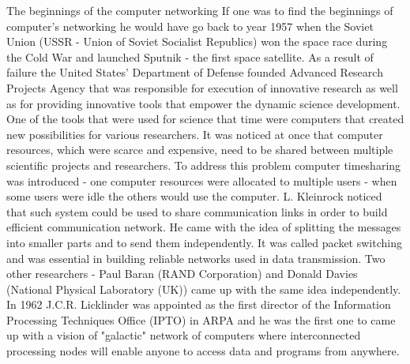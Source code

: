 \documentclass[magisterska,en]{pracamgr}
\begin{document}
\newpage
The beginnings of the computer networking
If one was to find the beginnings of computer's networking he would have go back to year 1957 when the Soviet Union (USSR - Union of Soviet Socialist Republics) won the space race during the Cold War and launched Sputnik - the first space satellite. As a result of failure the United States' Department of Defense founded Advanced Research Projects Agency that was responsible for execution of innovative research as well as for providing innovative tools that empower the dynamic science development.\cite{Internet_History_article} One of the tools that were used for science that time were computers that created new possibilities for various researchers. It was noticed at once that computer resources, which were scarce and expensive, need to be shared between multiple scientific projects and researchers. To address this problem computer timesharing was introduced - one computer resources were allocated to multiple users - when some users were idle the others would use the computer. L. Kleinrock noticed that such system could be used to share communication links in order to build efficient communication network. He came with the idea of splitting the messages into smaller parts and to send them independently. It was called packet switching and was essential in building reliable networks used in data transmission. Two other researchers - Paul Baran (RAND Corporation) and Donald Davies (National Physical Laboratory (UK)) came up with the same idea independently.
In 1962 J.C.R. Licklinder was appointed as the first director of the Information Processing Techniques Office (IPTO) in ARPA and he was the first one to came up with a vision of "galactic" network of computers where interconnected processing nodes will enable anyone to access data and programs from anywhere. \cite{Internet_History_article}
\end{document}
